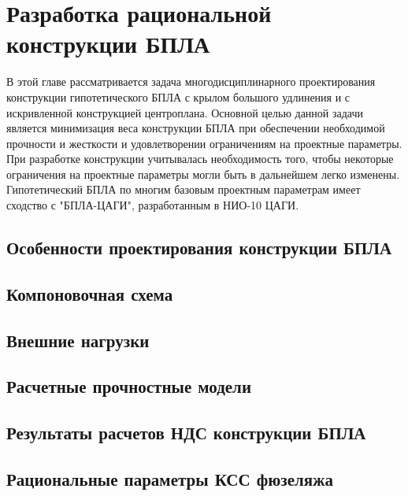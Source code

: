 \chapter{Разработка рациональной конструкции БПЛА}

В этой главе рассматривается задача многодисциплинарного проектирования конструкции гипотетического БПЛА с крылом большого удлинения и с искривленной конструкцией центроплана.  Основной целью данной задачи является минимизация веса конструкции БПЛА при обеспечении необходимой прочности и жесткости и удовлетворении ограничениям на проектные параметры. При разработке конструкции учитывалась необходимость того, чтобы некоторые ограничения на проектные параметры могли быть в дальнейшем легко изменены. Гипотетический БПЛА по многим базовым проектным параметрам имеет сходство с "БПЛА-ЦАГИ", разработанным в НИО-10 ЦАГИ.


\section{Особенности проектирования конструкции БПЛА}



\section{Компоновочная схема}
	

\section{Внешние нагрузки}
\label{sec:externalLoads}



\section{Расчетные прочностные модели}




\section{Результаты расчетов НДС конструкции БПЛА} 


\section{Рациональные параметры КСС фюзеляжа}

